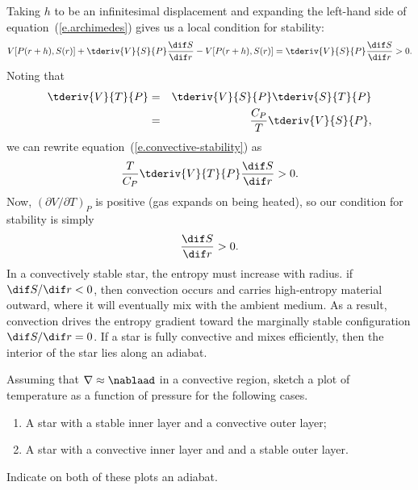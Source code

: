 Taking $h$ to be an infinitesimal displacement and expanding the left-hand side of equation~(\ref{e.archimedes}) gives us a local condition for stability:
\begin{equation}\label{e.convective-stability}
V[P(r+h),S(r)] + \tderiv{V}{S}{P}\frac{\dif S}{\dif r} - V[P(r+h),S(r)]  = \tderiv{V}{S}{P}\frac{\dif S}{\dif r} > 0 .
\end{equation}
Noting that
\begin{eqnarray*}
\tderiv{V}{T}{P} &=& \tderiv{V}{S}{P}\tderiv{S}{T}{P}\\
 &=& \frac{C_{P}}{T}\tderiv{V}{S}{P},
 \end{eqnarray*}
 we can rewrite equation~(\ref{e.convective-stability}) as
 \[
 \frac{T}{C_{P}}\tderiv{V}{T}{P}\frac{\dif S}{\dif r} > 0.
 \]
Now, $(\partial V/\partial T)_{P}$ is positive (gas expands on being heated), so our condition for stability is simply
 \begin{equation}\label{e.entropy-condition}
\frac{\dif S}{\dif r} > 0.
\end{equation}
In a convectively stable star, the entropy must increase with radius. if $\dif S/\dif r < 0$, then convection occurs and carries high-entropy material outward, where it will eventually mix with the ambient medium.  As a result, convection drives the entropy gradient toward the marginally stable configuration $\dif S/\dif r = 0$.  If a star is fully convective and mixes efficiently, then the interior of the star lies along an adiabat. 

\newpage
\begin{exercisebox}
Assuming that $\nabla \approx \nablaad$ in a convective region, sketch a plot of temperature as a function of pressure for the following cases.
\begin{enumerate}
\item A star with a stable inner layer and a convective outer layer;
\item A star with a convective inner layer and and a stable outer layer.
\end{enumerate}
Indicate on both of these plots an adiabat.
\end{exercisebox}

